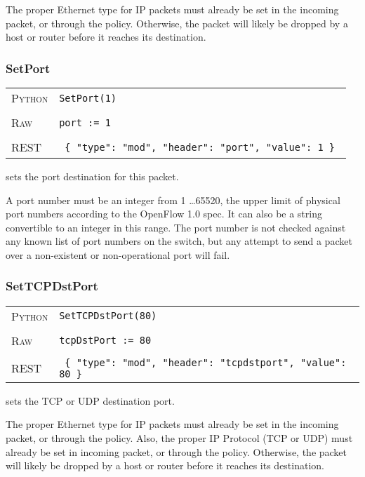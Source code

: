 The proper Ethernet type for IP packets must already be set in the incoming packet, or through the 
 policy.  Otherwise, the packet will likely be dropped by a host or router before it 
reaches its destination.

\subsubsection{SetPort}

\bigskip
\begin{tabularx}{\linewidth}{lX}
\textsc{Python}   & \texttt{SetPort(1)} \\ \\
\textsc{Raw}    & \texttt{port := 1}     \\ \\
\textsc{REST} & \texttt{ \{ "type": "mod", "header": "port", "value": 1 \} }
\end{tabularx}

 sets the port destination for this packet.      

A port number must be an integer from
1 \ldots 65520, the upper limit of physical port numbers according to the OpenFlow 1.0 spec.  It can also be 
a string convertible to an integer in this range.  The port number is not checked against any known list
of port numbers on the switch, but any attempt to send a packet over a non-existent or non-operational
port will fail.  

\subsubsection{SetTCPDstPort}

\bigskip
\begin{tabularx}{\linewidth}{lX}
\textsc{Python}   & \texttt{SetTCPDstPort(80)} \\ \\
\textsc{Raw}    & \texttt{tcpDstPort := 80}     \\ \\
\textsc{REST} & \texttt{ \{ "type": "mod", "header": "tcpdstport", "value": 80 \} }
\end{tabularx}

 sets the TCP or UDP destination port.      

The proper Ethernet type for IP packets must already be set in the incoming packet, or through the 
 policy.  
Also, the proper IP Protocol (TCP or UDP) must already be set in incoming packet, or through the 
 policy.  
Otherwise, the packet will likely be dropped by a host or router before it 
reaches its destination.

